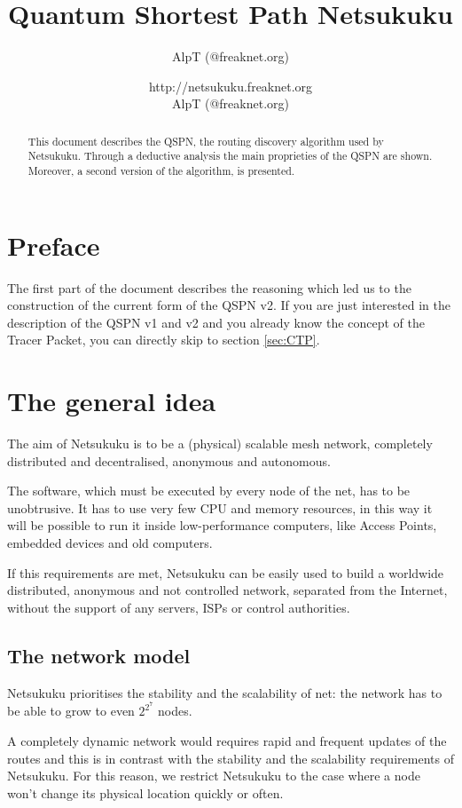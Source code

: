 \documentclass[a4paper]{article}
\title{Quantum Shortest Path Netsukuku}
\author{AlpT (@freaknet.org)}
\author{http://netsukuku.freaknet.org\\AlpT (@freaknet.org)}
\begin{document}
\maketitle

\begin{abstract}
	This document describes the QSPN, the routing discovery algorithm used
	by Netsukuku.
	Through a deductive analysis the main proprieties of the QSPN are
	shown. Moreover, a second version of the algorithm, is presented.
\end{abstract}

\section{Preface}
\label{sec:preface}

The first part of the document describes the reasoning which led us to the
construction of the current form of the QSPN v2.
If you are just interested in the description of the QSPN v1 and v2 and you
already know the concept of the Tracer Packet, you can directly skip to
section \ref{sec:CTP}.

\section{The general idea}
\label{sec:general_idea}

The aim of Netsukuku is to be a (physical) scalable mesh network, completely
distributed and decentralised, anonymous and autonomous.

The software, which must be executed by every node of the net, has to be
unobtrusive. It has to use very few CPU and memory resources, in this way it
will be possible to run it inside low-performance computers, like Access Points,
embedded devices and old computers.

If this requirements are met, Netsukuku can be easily used to build a worldwide
distributed, anonymous and not controlled network, separated from the
Internet, without the support of any servers, ISPs or control authorities.

\subsection{The network model}
\label{sec:net_model}

Netsukuku prioritises the stability and the scalability of net: the network
has to be able to grow to even $2^{2^7}$ nodes.

A completely dynamic network would requires rapid and frequent updates
of the routes and this is in contrast with the stability and the scalability
requirements of Netsukuku.
For this reason, we restrict Netsukuku to the case where a node won't change
its physical location quickly or often.
\end{document}

